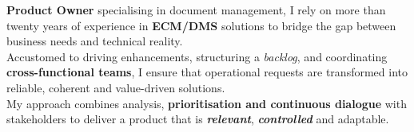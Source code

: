 \par{
\textbf{Product Owner} specialising in document management, I rely on more than twenty years of experience in \textbf{ECM/DMS} solutions to bridge the gap between business needs and technical reality. \\
Accustomed to driving enhancements, structuring a \emph{backlog}, and coordinating \textbf{cross-functional teams}, I ensure that operational requests are transformed into reliable, coherent and value-driven solutions. \\
My approach combines analysis, \textbf{prioritisation and continuous dialogue} with stakeholders to deliver a product that is \textbf{\emph{relevant}}, \textbf{\emph{controlled}} and adaptable.
}
